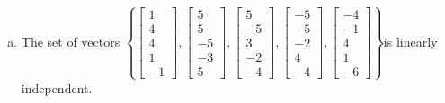 \begin{exerciseAnswer}
\begin{enumerate}[(a)]
\item  The set of vectors \( \left\{ \left[\begin{array}{c}
1 \\
4 \\
4 \\
1 \\
-1
\end{array}\right] , \left[\begin{array}{c}
5 \\
5 \\
-5 \\
-3 \\
5
\end{array}\right] , \left[\begin{array}{c}
5 \\
-5 \\
3 \\
-2 \\
-4
\end{array}\right] , \left[\begin{array}{c}
-5 \\
-5 \\
-2 \\
4 \\
-4
\end{array}\right] , \left[\begin{array}{c}
-4 \\
-1 \\
4 \\
1 \\
-6
\end{array}\right] \right\} \)is linearly independent.
\end{enumerate}
    
\end{exerciseAnswer}
    
